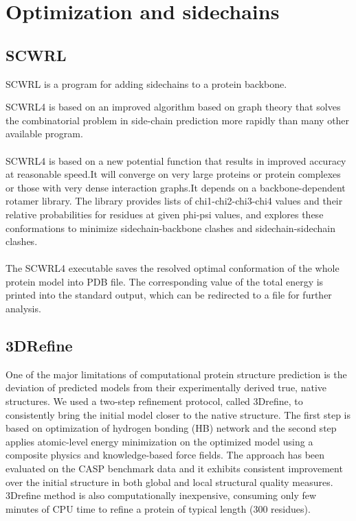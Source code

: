 \documentclass{article}
\begin{document}
\section{Optimization and sidechains}

\subsection{SCWRL}

SCWRL is a program for adding sidechains to a protein backbone.

SCWRL4 is based on an improved algorithm based on graph theory that solves the combinatorial problem in side-chain prediction more rapidly than many other available program.\\\\

SCWRL4 is based on a new potential function that results in improved accuracy at reasonable speed.It will converge on very large proteins or protein complexes or those with very dense interaction graphs.It depends on a backbone-dependent rotamer library. The library provides lists of chi1-chi2-chi3-chi4 values and their relative probabilities for residues at given phi-psi values, and explores these conformations to minimize sidechain-backbone clashes and sidechain-sidechain clashes.\\\\

The SCWRL4 executable saves the resolved optimal conformation of the whole protein model into PDB file. The corresponding value of the total energy is printed into the standard output, which can be redirected to a file for further analysis.

\subsection{3DRefine}

One of the major limitations of computational protein structure prediction is the deviation of predicted models from their experimentally derived true, native structures.
	We used a two-step refinement protocol, called 3Drefine, to consistently bring the initial model closer to the native structure. The first step is based on optimization of hydrogen bonding (HB) network and the second step applies atomic-level energy minimization on the optimized model using a composite physics and knowledge-based force fields. The approach has been evaluated on the CASP benchmark data and it exhibits consistent improvement over the initial structure in both global and local structural quality measures. 3Drefine method is also computationally inexpensive, consuming only few minutes of CPU time to refine a protein of typical length (300 residues).
\end{document}
